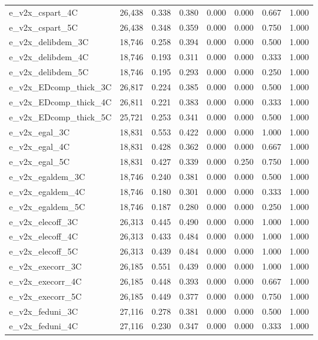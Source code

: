 \begin{table}[!htbp]
\begin{tabular}{@{\extracolsep{5pt}}lccccccc}
e\_v2x\_cspart\_4C & 26,438 & 0.338 & 0.380 & 0.000 & 0.000 & 0.667 & 1.000 \\ 
e\_v2x\_cspart\_5C & 26,438 & 0.348 & 0.359 & 0.000 & 0.000 & 0.750 & 1.000 \\ 
e\_v2x\_delibdem\_3C & 18,746 & 0.258 & 0.394 & 0.000 & 0.000 & 0.500 & 1.000 \\ 
e\_v2x\_delibdem\_4C & 18,746 & 0.193 & 0.311 & 0.000 & 0.000 & 0.333 & 1.000 \\ 
e\_v2x\_delibdem\_5C & 18,746 & 0.195 & 0.293 & 0.000 & 0.000 & 0.250 & 1.000 \\ 
e\_v2x\_EDcomp\_thick\_3C & 26,817 & 0.224 & 0.385 & 0.000 & 0.000 & 0.500 & 1.000 \\ 
e\_v2x\_EDcomp\_thick\_4C & 26,811 & 0.221 & 0.383 & 0.000 & 0.000 & 0.333 & 1.000 \\ 
e\_v2x\_EDcomp\_thick\_5C & 25,721 & 0.253 & 0.341 & 0.000 & 0.000 & 0.500 & 1.000 \\ 
e\_v2x\_egal\_3C & 18,831 & 0.553 & 0.422 & 0.000 & 0.000 & 1.000 & 1.000 \\ 
e\_v2x\_egal\_4C & 18,831 & 0.428 & 0.362 & 0.000 & 0.000 & 0.667 & 1.000 \\ 
e\_v2x\_egal\_5C & 18,831 & 0.427 & 0.339 & 0.000 & 0.250 & 0.750 & 1.000 \\ 
e\_v2x\_egaldem\_3C & 18,746 & 0.240 & 0.381 & 0.000 & 0.000 & 0.500 & 1.000 \\ 
e\_v2x\_egaldem\_4C & 18,746 & 0.180 & 0.301 & 0.000 & 0.000 & 0.333 & 1.000 \\ 
e\_v2x\_egaldem\_5C & 18,746 & 0.187 & 0.280 & 0.000 & 0.000 & 0.250 & 1.000 \\ 
e\_v2x\_elecoff\_3C & 26,313 & 0.445 & 0.490 & 0.000 & 0.000 & 1.000 & 1.000 \\ 
e\_v2x\_elecoff\_4C & 26,313 & 0.433 & 0.484 & 0.000 & 0.000 & 1.000 & 1.000 \\ 
e\_v2x\_elecoff\_5C & 26,313 & 0.439 & 0.484 & 0.000 & 0.000 & 1.000 & 1.000 \\ 
e\_v2x\_execorr\_3C & 26,185 & 0.551 & 0.439 & 0.000 & 0.000 & 1.000 & 1.000 \\ 
e\_v2x\_execorr\_4C & 26,185 & 0.448 & 0.393 & 0.000 & 0.000 & 0.667 & 1.000 \\ 
e\_v2x\_execorr\_5C & 26,185 & 0.449 & 0.377 & 0.000 & 0.000 & 0.750 & 1.000 \\ 
e\_v2x\_feduni\_3C & 27,116 & 0.278 & 0.381 & 0.000 & 0.000 & 0.500 & 1.000 \\ 
e\_v2x\_feduni\_4C & 27,116 & 0.230 & 0.347 & 0.000 & 0.000 & 0.333 & 1.000 \\ 

\end{tabular}
\end{table}
